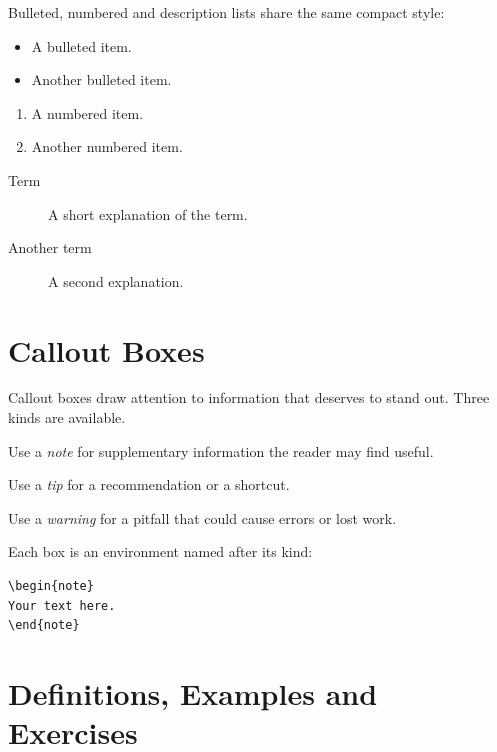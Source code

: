 Bulleted, numbered and description lists share the same compact style:

\begin{itemize}
  \item A bulleted item.
  \item Another bulleted item.
\end{itemize}

\begin{enumerate}
  \item A numbered item.
  \item Another numbered item.
\end{enumerate}

\begin{description}
  \item[Term] A short explanation of the term.
  \item[Another term] A second explanation.
\end{description}

\section{Callout Boxes}\label{sec:callouts}

Callout boxes draw attention to information that deserves to stand out. Three
kinds are available.

\begin{note}
Use a \emph{note} for supplementary information the reader may find useful.
\end{note}

\begin{tip}
Use a \emph{tip} for a recommendation or a shortcut.
\end{tip}

\begin{warning}
Use a \emph{warning} for a pitfall that could cause errors or lost work.
\end{warning}

\noindent Each box is an environment named after its kind:

\begin{lstlisting}[language={[LaTeX]TeX}]
\begin{note}
Your text here.
\end{note}
\end{lstlisting}

\section{Definitions, Examples and Exercises}\label{sec:theorems}

